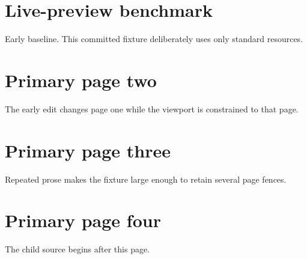 \documentclass{article}
\begin{document}
\section*{Live-preview benchmark}
Early baseline. This committed fixture deliberately uses only standard resources.

\newpage
\section*{Primary page two}
The early edit changes page one while the viewport is constrained to that page.

\newpage
\section*{Primary page three}
Repeated prose makes the fixture large enough to retain several page fences.

\newpage
\section*{Primary page four}
The child source begins after this page.


\end{document}
